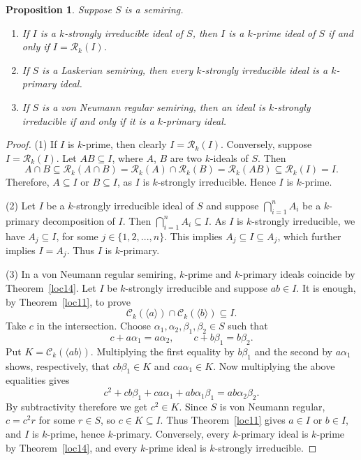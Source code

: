 \documentclass[10pt,a4paper]{amsart}
\newtheorem{proposition}{Proposition}
\begin{document}
\begin{proposition}\label{loc3}
Suppose $S$ is a semiring. 
\begin{enumerate}
\item If $I$ is a $k$-strongly irreducible ideal of $S$, then $I$ is a $k$-prime ideal of $S$ if and only if $I=\mathcal{R}_k(I)$.
\item If $S$ is a Laskerian semiring, then every $k$-strongly irreducible ideal is a $k$-primary ideal.

\item If $S$ is a von Neumann regular semiring, then an ideal is $k$-strongly irreducible if and only if
it is a $k$-primary ideal.
\end{enumerate}
\end{proposition}

\begin{proof}
	(1) If $I$ is $k$-prime, then clearly $I=\mathcal{R}_k(I)$. Conversely, suppose $I=\mathcal{R}_k(I)$. Let $AB \subseteq I$, where $A$, $B$ are two $k$-ideals of $S$. Then \[A\cap B \subseteq \mathcal{R}_k(A\cap B)=\mathcal{R}_k(A)\cap \mathcal{R}_k(B)=\mathcal{R}_k(AB)\subseteq \mathcal{R}_k(I)=I.\] Therefore, $A \subseteq I$ or $B \subseteq I$, as $I$ is $k$-strongly irreducible. Hence $I$ is $k$-prime.
    
        (2) Let $I$ be a $k$-strongly irreducible ideal of $S$ and suppose $\bigcap\limits_{i=1}^n A_i$ be a $k$-primary decomposition  of $I$. Then $\bigcap\limits_{i=1}^n A_i \subseteq I$. As $I$ is $k$-strongly irreducible, we have $A
        _j \subseteq I$, for some $j\in \{1,2,...,n\}$. This implies $A_j \subseteq I \subseteq A_j$, which further implies $I=A_j$. Thus $I$ is $k$-primary.
        
        (3) In a von Neumann regular semiring, $k$-prime and $k$-primary ideals coincide by Theorem~\ref{loc14}. Let $I$ be $k$-strongly irreducible and suppose $ab\in I$. It is enough, by Theorem~\ref{loc11}, to prove
\[
\mathcal C_k(\langle a\rangle)\cap\mathcal C_k(\langle b\rangle)\subseteq I.
\]
Take $c$ in the intersection. Choose $\alpha_1,\alpha_2,\beta_1,\beta_2\in S$ such that
\[
c+a\alpha_1=a\alpha_2,\qquad c+b\beta_1=b\beta_2.
\]
Put $K=\mathcal C_k(\langle ab\rangle)$. Multiplying the first equality by $b\beta_1$ and the second by $a\alpha_1$ shows, respectively, that $cb\beta_1\in K$ and $ca\alpha_1\in K$. Now multiplying the above equalities gives
\[
c^2+cb\beta_1+ca\alpha_1+ab\alpha_1\beta_1=ab\alpha_2\beta_2.
\]
By subtractivity therefore we get $c^2\in K$. Since $S$ is von Neumann regular, $c=c^2r$ for some $r\in S$, so $c\in K\subseteq I$. Thus Theorem~\ref{loc11} gives $a\in I$ or $b\in I$, and $I$ is $k$-prime, hence $k$-primary. Conversely, every $k$-primary ideal is $k$-prime by Theorem~\ref{loc14}, and every $k$-prime ideal is $k$-strongly irreducible.
\end{proof}
\end{document}
